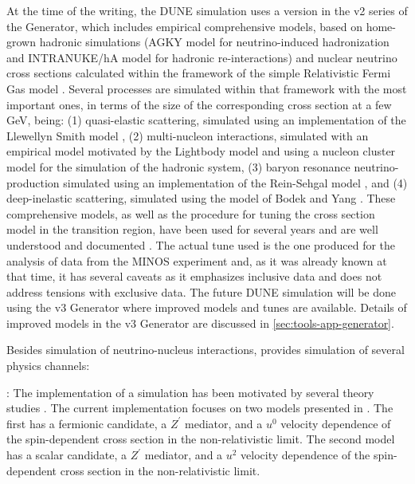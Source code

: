 At the time of the  writing, the DUNE simulation uses a version in the v2 series of the  Generator, which includes empirical comprehensive models, based on home-grown hadronic simulations (AGKY model \cite{Yang:2009zx} for neutrino-induced hadronization and INTRANUKE/hA model \cite{Dytman:2015taa} for hadronic re-interactions) and nuclear neutrino cross sections calculated within the framework of the simple Relativistic Fermi Gas model \cite{Bodek:1981wr}. Several processes are simulated within that framework with the most important ones, in terms of the size of the corresponding cross section at a few GeV, being: (1) quasi-elastic scattering, simulated using an implementation of the Llewellyn Smith model \cite{LlewellynSmith:1971uhs}, (2) multi-nucleon interactions, simulated with an empirical model motivated by the Lightbody model \cite{Lightbody:1988gcu} and using a nucleon cluster model for the simulation of the hadronic system, (3) baryon resonance neutrino-production simulated using an implementation of the Rein-Sehgal model \cite{Rein:1980wg}, and (4) deep-inelastic scattering, simulated using the model of Bodek and Yang \cite{Bodek:2002ps}.  These comprehensive models, as well as the  procedure for tuning the cross section model in the transition region, have been used for several years and are well understood and documented \cite{Andreopoulos:2009rq}. The actual tune used is the one produced for the analysis of data from the MINOS experiment and, as it was already known at that time, it has several caveats as it emphasizes inclusive data and does not address tensions with exclusive data. The future DUNE simulation will be done using the v3  Generator where improved models and tunes are available. Details of improved models in the v3  Generator are discussed in \ref{sec:tools-app-generator}. %



Besides simulation of neutrino-nucleus interactions,  provides simulation of several  physics channels:

\textit{}: The implementation of a   simulation has been motivated by several theory studies \cite{Agashe:2014yua, 
Berger:2014sqa, Kong:2014mia, Cherry:2015oca, Kopp:2015bfa, Necib:2016aez, Alhazmi:2016qcs, Kim:2016zjx}. The current implementation focuses on two models presented in  \cite{Berger:2014sqa}. The first has a fermionic  candidate, a $Z^\prime$ mediator, and a $u^0$ velocity dependence of the spin-dependent cross section in the non-relativistic limit. The second model has a scalar  candidate, a $Z^\prime$ mediator, and a $u^2$ velocity dependence of the spin-dependent cross section in the non-relativistic limit.

